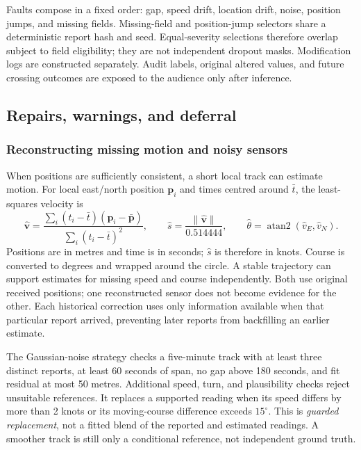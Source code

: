 \documentclass[11pt]{article}
\begin{document}
Faults compose in a fixed order: gap, speed drift, location drift, noise, position jumps, and missing fields. Missing-field and position-jump selectors share a deterministic report hash and seed. Equal-severity selections therefore overlap subject to field eligibility; they are not independent dropout masks. Modification logs are constructed separately. Audit labels, original altered values, and future crossing outcomes are exposed to the audience only after inference.

\subsection{Repairs, warnings, and deferral}
\subsubsection{Reconstructing missing motion and noisy sensors}
When positions are sufficiently consistent, a short local track can estimate motion. For local east/north position $\mathbf p_i$ and times centred around $\bar t$, the least-squares velocity is
\[
 \widehat{\mathbf v}=
 \frac{\sum_i(t_i-\bar t)(\mathbf p_i-\bar{\mathbf p})}
      {\sum_i(t_i-\bar t)^2},\qquad
 \widehat s=\frac{\lVert\widehat{\mathbf v}\rVert}{0.514444},\qquad
 \widehat\theta=\operatorname{atan2}(\widehat v_E,\widehat v_N).
\]
Positions are in metres and time is in seconds; $\widehat s$ is therefore in knots. Course is converted to degrees and wrapped around the circle. A stable trajectory can support estimates for missing speed and course independently. Both use original received positions; one reconstructed sensor does not become evidence for the other. Each historical correction uses only information available when that particular report arrived, preventing later reports from backfilling an earlier estimate.

The Gaussian-noise strategy checks a five-minute track with at least three distinct reports, at least 60 seconds of span, no gap above 180 seconds, and fit residual at most 50 metres. Additional speed, turn, and plausibility checks reject unsuitable references. It replaces a supported reading when its speed differs by more than 2 knots or its moving-course difference exceeds $15^\circ$. This is \emph{guarded replacement}, not a fitted blend of the reported and estimated readings. A smoother track is still only a conditional reference, not independent ground truth.
\end{document}
